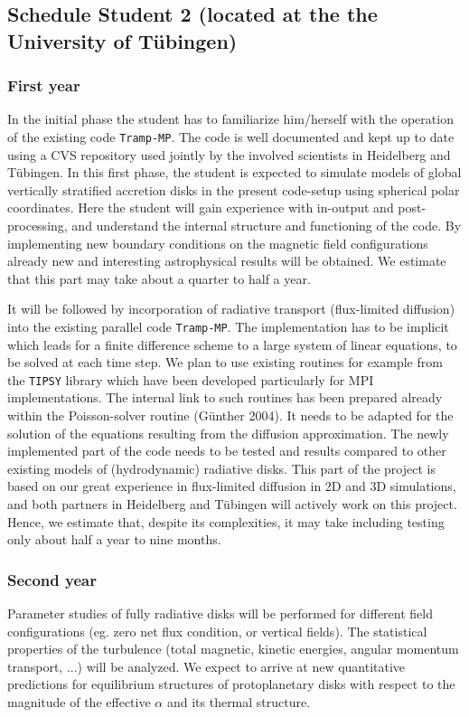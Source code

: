 
\subsection{Schedule Student 2 (located at the the University of T\"ubingen)}
\subsubsection{First year} 
In the initial phase the student has to familiarize him/herself with the
operation of the existing code {\tt Tramp-MP}. The code is well documented
and kept up to date using a CVS repository used jointly by the involved
scientists in Heidelberg and T\"ubingen.  In this first phase, the student
is expected to simulate models of global vertically stratified accretion
disks in the present code-setup using spherical polar coordinates. Here the
student will gain experience with in-output and post-processing, and
understand the internal structure and functioning of the code. By
implementing new boundary conditions on the magnetic field configurations
already new and interesting astrophysical results will be obtained.  We
estimate that this part may take about a quarter to half a year.

It will be followed by incorporation of radiative transport (flux-limited
diffusion) into the existing parallel code {\tt Tramp-MP}.  The
implementation has to be implicit which leads for a finite difference scheme
to a large system of linear equations, to be solved at each time step.  We
plan to use existing routines for example from the {\tt TIPSY} library which
have been developed particularly for MPI implementations.  The internal link
to such routines has been prepared already within the Poisson-solver routine
(G\"unther 2004). It needs to be adapted for the solution of the equations
resulting from the diffusion approximation.  The newly implemented part of
the code needs to be tested and results compared to other existing models of
(hydrodynamic) radiative disks.  This part of the project is based on our
great experience in flux-limited diffusion in 2D and 3D simulations, and
both partners in Heidelberg and T\"ubingen will actively work on this
project.  Hence, we estimate that, despite its complexities, it may take
including testing only about half a year to nine months.
%
\subsubsection{Second year} 
%
Parameter studies of fully radiative disks will be performed for different
field configurations (eg. zero net flux condition, or vertical fields).  The
statistical properties of the turbulence (total magnetic, kinetic energies,
angular momentum transport, ...) will be analyzed. We expect to arrive at
new quantitative predictions for equilibrium structures of protoplanetary
disks with respect to the magnitude of the effective $\alpha$ and its
thermal structure.

